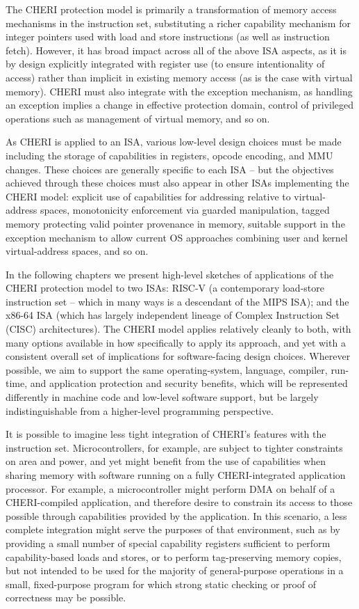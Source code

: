 The CHERI protection model is primarily a transformation of memory access
mechanisms in the instruction set, substituting a richer capability mechanism
for integer pointers used with load and store instructions (as well as
instruction fetch).
However, it has broad impact across all of the above ISA aspects, as it is by
design explicitly integrated with register use (to ensure intentionality of
access) rather than implicit in existing memory access (as is the case with
virtual memory).
CHERI must also integrate with the exception mechanism, as handling an
exception implies a change in effective protection domain, control of
privileged operations such as management of virtual memory, and so on.

As CHERI is applied to an ISA, various low-level design choices must
be made including the storage of capabilities in registers, opcode
encoding, and MMU changes.  These choices are generally specific to
each ISA -- but the objectives achieved through these choices must also appear in
other ISAs implementing the CHERI model: explicit use of capabilities for
addressing relative to virtual-address spaces, monotonicity enforcement via
guarded manipulation, tagged memory protecting valid pointer provenance in
memory, suitable support in the exception mechanism to allow current OS
approaches combining user and kernel virtual-address spaces, and so on.

In the following chapters we present high-level sketches of applications of
the CHERI protection model to two ISAs:
RISC-V (a contemporary load-store instruction
set -- which in many ways is a descendant of the MIPS ISA); and the x86-64 ISA
(which has largely independent lineage of Complex Instruction Set (CISC)
architectures).
The CHERI model applies relatively cleanly to both, with many options
available in how specifically to apply its approach, and yet with a consistent
overall set of implications for software-facing design choices.
Wherever possible, we aim to support the same operating-system, language,
compiler, run-time, and application protection and security benefits, which
will be represented differently in machine code and low-level software
support, but be largely indistinguishable from a higher-level programming
perspective.

It is possible to imagine less tight integration of CHERI's features with the
instruction set.
Microcontrollers, for example, are subject to tighter constraints on area and
power, and yet might benefit from the use of capabilities when sharing memory
with software running on a fully CHERI-integrated application processor.
For example, a microcontroller might perform DMA on behalf of a CHERI-compiled
application, and therefore desire to constrain its access to those possible
through capabilities provided by the application.
In this scenario, a less complete integration might serve the purposes of that
environment, such as by providing a small number of special capability
registers sufficient to perform capability-based loads and stores, or to
perform tag-preserving memory copies, but not intended to be used for the
majority of general-purpose operations in a small, fixed-purpose program for
which strong static checking or proof of correctness may be possible.

